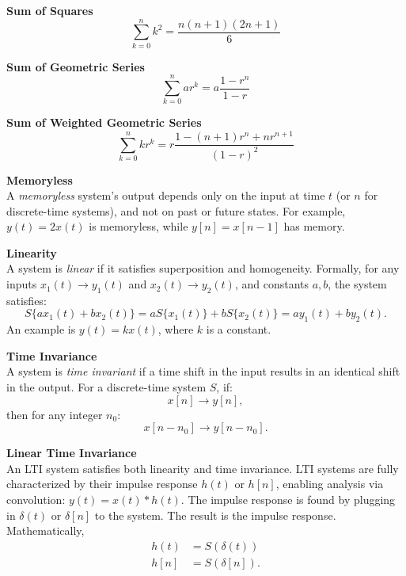 \documentclass{article}
\begin{document}
\begin{multicols}{2}

    \noindent\textbf{Sum of Squares}\\
    \begin{equation*}
        \sum_{k=0}^{n} k^2 = \frac{n(n+1)(2n+1)}{6}
    \end{equation*}

    \noindent\textbf{Sum of Geometric Series}\\
    \begin{equation*}
        \sum_{k=0}^{n} ar^k = a\frac{1-r^n}{1-r}
    \end{equation*}

    \noindent\textbf{Sum of Weighted Geometric Series}\\
    \begin{equation*}
        \sum_{k=0}^{n} kr^k = r\frac{1- (n + 1)r^n +nr^{n + 1}}{(1-r)^2}
    \end{equation*}

    \noindent\textbf{Memoryless}\\
    A \emph{memoryless} system's output depends only on the input at time
    \( t \) (or \( n \) for discrete-time systems), and not on past or
    future states. For example, \( y(t) = 2x(t) \) is memoryless, while
    \( y[n] = x[n-1] \) has memory.

    \noindent\textbf{Linearity}\\
    A system is \emph{linear} if it satisfies superposition and homogeneity.
    Formally, for any inputs \( x_1(t) \rightarrow y_1(t) \) and
    \( x_2(t) \rightarrow y_2(t) \), and constants \( a, b \), the system
    satisfies:
    \[
        S\{a x_1(t) + b x_2(t)\} = a S\{x_1(t)\} + b S\{x_2(t)\} = a y_1(t) + b y_2(t).
    \]
    An example is \( y(t) = kx(t) \), where \( k \) is a constant.

    \noindent\textbf{Time Invariance}\\
    A system is \emph{time invariant} if a time shift in the input results in
    an identical shift in the output. For a discrete-time system \( S \), if:
    \[
        x[n] \rightarrow y[n],
    \]
    then for any integer \( n_0 \):
    \[
        x[n - n_0] \rightarrow y[n - n_0].
    \]

    \noindent\textbf{Linear Time Invariance}\\
    An LTI system satisfies both linearity and time invariance.
    LTI systems are fully characterized by their impulse response
    \( h(t) \) or \( h[n] \), enabling analysis via convolution:
    \( y(t) = x(t) * h(t) \). The impulse response is found by
    plugging in $\delta(t)$ or $\delta[n]$ to the system. The result
    is the impulse response. Mathematically,
    \begin{align*}
        h(t) & = S(\delta(t))  \\
        h[n] & = S(\delta[n]).
    \end{align*}


\end{multicols}
\end{document}
